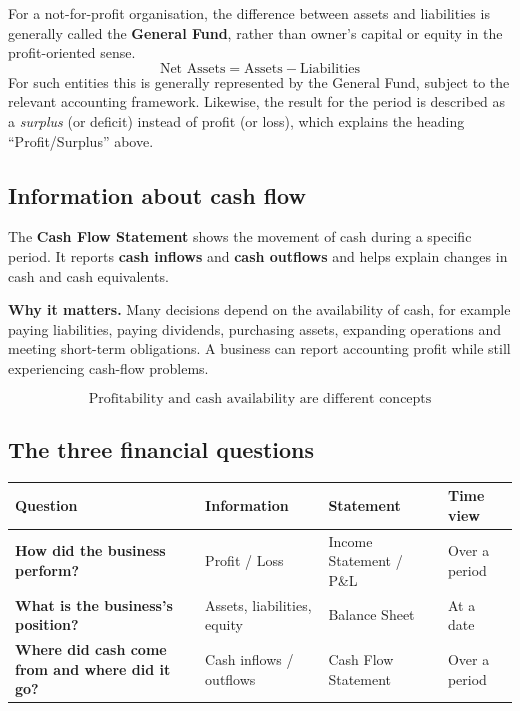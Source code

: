 \documentclass[11pt,a4paper]{article}
\begin{document}
\begin{impbox}
For a not-for-profit organisation, the difference between assets and liabilities is generally called the
\textbf{General Fund}, rather than owner's capital or equity in the profit-oriented sense.
\[
\text{Net Assets}=\text{Assets}-\text{Liabilities}
\]
For such entities this is generally represented by the General Fund, subject to the relevant accounting
framework. Likewise, the result for the period is described as a \emph{surplus} (or deficit) instead
of profit (or loss), which explains the heading ``Profit/Surplus'' above.
\end{impbox}

\subsection{Information about cash flow}

The \textbf{Cash Flow Statement} shows the movement of cash during a specific period. It reports
\textbf{cash inflows} and \textbf{cash outflows} and helps explain changes in cash and cash equivalents.

\textbf{Why it matters.} Many decisions depend on the availability of cash, for example paying liabilities,
paying dividends, purchasing assets, expanding operations and meeting short-term obligations. A business
can report accounting profit while still experiencing cash-flow problems.

\[
\boxed{\text{Profitability and cash availability are different concepts}}
\]

\subsection{The three financial questions}

\begin{center}
\small
\begin{tabularx}{\textwidth}{@{}Y Y Y Y@{}}
\toprule
{}\textbf{Question} & \textbf{Information} & \textbf{Statement} & \textbf{Time view}\\
\midrule
\textbf{How did the business perform?} & Profit / Loss & Income Statement / P\&L & Over a period\\
\textbf{What is the business's position?} & Assets, liabilities, equity & Balance Sheet & At a date\\
\textbf{Where did cash come from and where did it go?} & Cash inflows / outflows & Cash Flow Statement & Over a period\\
\bottomrule
\end{tabularx}
\end{center}
\end{document}
